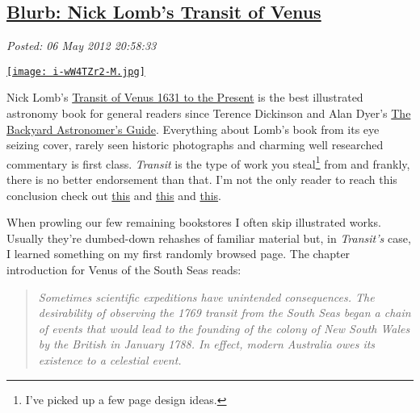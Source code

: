 %

\subsection*{\href{https://bakerjd99.wordpress.com/2012/05/06/blurb-nick-lombs-transit-of-venus/}{Blurb: Nick Lomb's Transit of Venus}}


\noindent\emph{Posted: 06 May 2012 20:58:33}
\vspace{6pt}

\captionsetup[floatingfigure]{labelformat=empty}
\begin{floatingfigure}[l]{0.25\textwidth}
\centering
\href{http://www.amazon.com/Transit-Venus-Present-Nick-Lomb/dp/1615190554}{\texttt{[image: i-wW4TZr2-M.jpg]}}
\label{fig:2744X0}
\end{floatingfigure}Nick
Lomb's \href{http://www.amazon.com/Transit-Venus-Present-Nick-Lomb/dp/1615190554}{Transit
of Venus 1631 to the Present} is the best illustrated astronomy book for
general readers since Terence Dickinson and Alan Dyer's
\href{http://www.barnesandnoble.com/w/the-backyard-astronomers-guide-terence-dickinson/1000313829}{The
Backyard Astronomer's Guide}. Everything about Lomb's book from its eye
seizing cover, rarely seen historic photographs and charming well
researched commentary is first class. \emph{Transit} is the type of work
you steal\footnote{
I've picked up a few page design ideas.
}
from and frankly, there is no better
endorsement than that. I'm not the only reader to reach this conclusion
check out
\href{http://transitofvenus.nl/wp/2011/11/03/nick-lombs-new-book/}{this}
and \href{http://adsabs.harvard.edu/full/2005Obs...125...45H}{this} and
\href{http://www.goodreads.com/book/show/13013236-transit-of-venus}{this}.

When prowling our few remaining bookstores I often skip illustrated
works. Usually they're dumbed-down rehashes of familiar material but, in
\emph{Transit's} case, I learned something on my first randomly browsed
page. The chapter introduction for Venus of the South Seas reads:

\begin{quotation}
\emph{Sometimes scientific expeditions have unintended consequences. The
desirability of observing the 1769 transit from the South Seas began a
chain of events that would lead to the founding of the colony of New
South Wales by the British in January 1788. In effect, modern Australia
owes its existence to a celestial event.}
\end{quotation}


